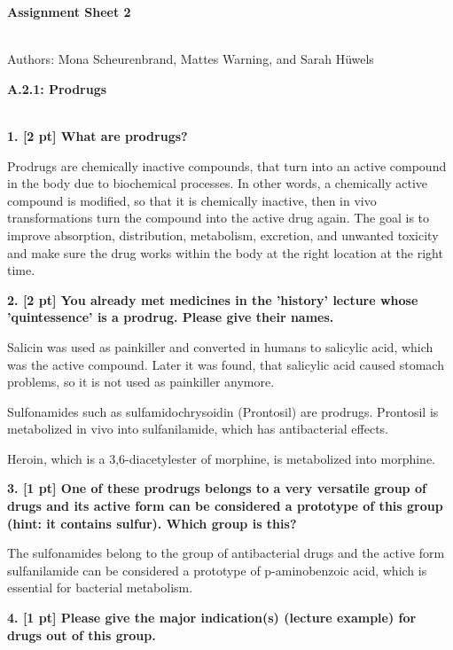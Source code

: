 \documentclass[a4paper,10pt]{article}
\begin{document}


\begin{huge}
	\vspace{1cm}
	\textbf{Assignment Sheet 2}
\end{huge} \\

Authors: Mona Scheurenbrand, Mattes Warning, and Sarah Hüwels


\begin{large}
	\vspace{1.0cm}
	\textbf{A.2.1: Prodrugs}
\end{large}	\\ [2mm]
\textbf{1. [2 pt] What are prodrugs?}

Prodrugs are chemically inactive compounds, that turn into an active compound in the body due to biochemical processes. In other words, a chemically active compound is modified, so that it is chemically inactive, then in vivo transformations turn the compound into the active drug again. \cite{Zawilska2013}
The goal is to improve absorption, distribution, metabolism, excretion, and unwanted toxicity and make sure the drug works within the body at the right location at the right time. \cite{Zawilska2013}

\textbf{2. [2 pt] You already met medicines in the ’history’ lecture whose ’quintessence’ is a prodrug. Please give their names.}

Salicin was used as painkiller and converted in humans to salicylic acid, which was the active compound. Later it was found, that salicylic acid caused stomach problems, so it is not used as painkiller anymore.  

Sulfonamides such as sulfamidochrysoidin (Prontosil) are prodrugs. Prontosil is metabolized in vivo into sulfanilamide, which has antibacterial effects.

Heroin, which is a 3,6-diacetylester of morphine, is metabolized into morphine.

\textbf{3. [1 pt] One of these prodrugs belongs to a very versatile group of drugs and its active form can be considered a prototype of this group (hint: it contains sulfur). Which group is this?}

The sulfonamides belong to the group of antibacterial drugs and the active form sulfanilamide can be considered a prototype of p-aminobenzoic acid, which is essential for bacterial metabolism. 
    
\textbf{4. [1 pt] Please give the major indication(s) (lecture example) for drugs out of this group.}
    
\end{document}
